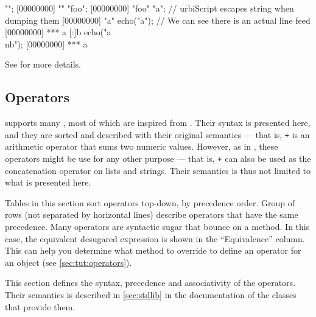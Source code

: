 \begin{urbiscript}[firstnumber=last]
"";
[00000000] ""
"foo";
[00000000] "foo"
"a\nb"; // urbiScript escapes string when dumping them
[00000000] "a\nb"
echo("a\nb"); // We can see there is an actual line feed
[00000000] *** a
[:]b
echo("a\\nb");
[00000000] *** a\nb
\end{urbiscript}

See  for more details.

\subsection{Operators}

\us supports many , most of which are inspired from
\Cxx. Their syntax is presented here, and they are sorted and
described with their original semantics --- that is, \lstinline|+| is
an arithmetic operator that sums two numeric values. However, as in
\Cxx, these operators might be use for any other purpose --- that is,
\lstinline|+| can also be used as the concatenation operator on lists
and strings. Their semantics is thus not limited to what is presented
here.

Tables in this section sort operators top-down, by precedence order.
Group of rows (not separated by horizontal lines) describe operators
that have the same precedence. Many operators are syntactic sugar that
bounce on a method. In this case, the equivalent desugared expression
is shown in the ``Equivalence'' column. This can help you determine
what method to override to define an operator for an object (see
\autoref{sec:tut:operators}).

This section defines the syntax, precedence and associativity of the
operators. Their semantics is described in \autoref{sec:stdlib} in the
documentation of the classes that provide them.

\newcommand{\operatorhead}{Operator & Use & Associativity & Original semantic
  & Equivalence\\}


\newcommand{\operator}[6][ ]{\lstinline@#2@&\lstinline@#3@&#4&#5&\lstinline@#6@#1\\}
\newcommand{\boperator}[3]{\operator{#1}{a #1 b}{#2}{#3}{a.'#1'(b)}}
\newcommand{\poperator}[3]{\operator{#1}{#1a}{#2}{#3}{a.'#1'()}}

\newcommand{\operatordot}    {\operator  {.}    {a.b}              {-}     {Message sending}          {Not redefinable}       }
\newcommand{\operatordota}   {\operator  {.}    {a.b(args)}        {-}     {Message sending}          {Not redefinable}       }
\newcommand{\operatorsub}    {\operator  {[]}   {a[args]}          {-}     {Subscript}                {a.'[]'(args)}          }
\newcommand{\operatorsubass} {\operator  {[] =} {a[args] = v}      {-}     {Subscript assignment}     {a.'[]='(args, v)}      }
\newcommand{\operatorass}[2][ ]    {\operator[#1]
                                         {=}    {a = b}            {Right} {Assignment}               {updateSlot("a", b)}    }

